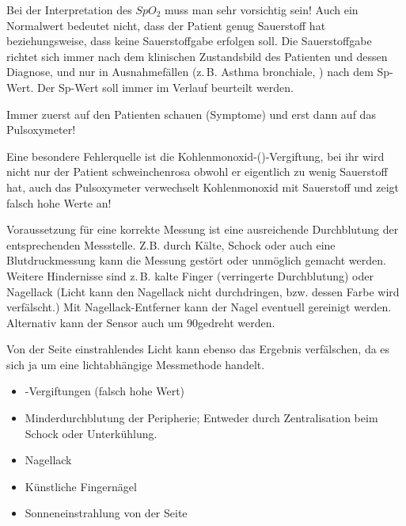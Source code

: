 {
Bei der Interpretation des
$SpO_2$ muss man sehr vorsichtig sein! Auch ein Normalwert bedeutet nicht, dass der Patient
genug Sauerstoff hat beziehungsweise, dass keine
Sauerstoffgabe erfolgen soll. Die Sauerstoffgabe richtet
sich immer nach dem klinischen
Zustandsbild des Patienten und dessen Diagnose, und nur in
Ausnahmefällen (z.\,B. Asthma bronchiale,
) nach dem
Sp-Wert. Der Sp-Wert soll immer im Verlauf beurteilt werden. 
\cite{soehnke200607}
}{
{\SymbolText}
}


Immer
zuerst auf den Patienten schauen (Symptome) und erst dann auf das Pulsoxymeter!



{
Eine besondere Fehlerquelle ist die
Kohlenmonoxid-()-Vergiftung, bei ihr wird nicht nur
der Patient schweinchenrosa obwohl er eigentlich zu wenig
Sauerstoff hat, auch das Pulsoxymeter verwechselt
Kohlenmonoxid mit Sauerstoff und zeigt falsch hohe Werte an!

Voraussetzung für eine korrekte Messung ist eine ausreichende
Durchblutung der entsprechenden Messstelle. Z.B. durch Kälte,
Schock oder auch eine Blutdruckmessung kann die Messung
gestört oder unmöglich gemacht werden. Weitere Hindernisse
sind z.\,B. kalte Finger (verringerte Durchblutung) oder
Nagellack (Licht kann den Nagellack nicht durchdringen,
bzw. dessen Farbe wird verfälscht.) Mit
Nagellack-Entferner kann der Nagel eventuell
gereinigt werden. Alternativ kann der Sensor auch
um 90\textdegree gedreht werden. 

Von der Seite einstrahlendes Licht kann ebenso das Ergebnis
verfälschen, da es sich ja um eine lichtabhängige
Messmethode handelt.
}{
\begin{itemize}
	\item {}-Vergiftungen (falsch hohe Wert)
	\item Minderdurchblutung der Peripherie; Entweder durch Zentralisation beim Schock oder Unterkühlung.
	\item Nagellack
	\item Künstliche Fingernägel
	\item Sonneneinstrahlung von der Seite
\end{itemize}
}{}{}{}




